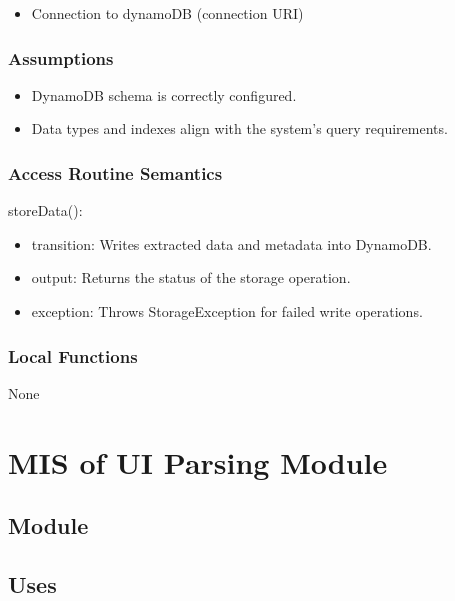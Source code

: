 \documentclass[12pt, titlepage]{article}
\begin{document}
\begin{itemize}
  \item Connection to dynamoDB (connection URI)
\end{itemize}

\subsubsection{Assumptions}

\begin{itemize}
  \item DynamoDB schema is correctly configured.
  \item Data types and indexes align with the system’s query requirements.
\end{itemize}

\subsubsection{Access Routine Semantics}

\noindent storeData():
\begin{itemize}
\item transition: Writes extracted data and metadata into DynamoDB.
\item output: Returns the status of the storage operation.
\item exception: Throws StorageException for failed write operations.
\end{itemize}

\subsubsection{Local Functions}

None

\newpage


\section{MIS of UI Parsing Module} \label{Module}

\subsection{Module}

\subsection{Uses}
\end{document}
